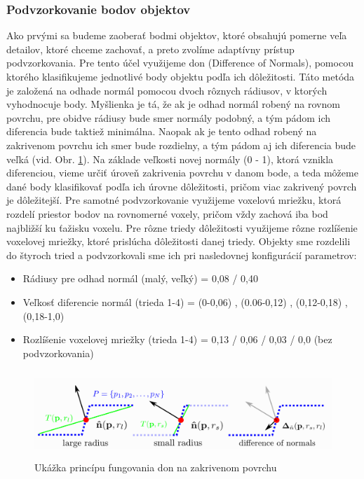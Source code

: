 \subsubsection{Podvzorkovanie bodov objektov}
\noindent Ako prvými sa budeme zaoberať bodmi objektov, ktoré obsahujú pomerne veľa detailov, ktoré chceme zachovať, a preto zvolíme adaptívny prístup podvzorkovania.
\newline\indent Pre tento účel využijeme \acrshort{don} (Difference of Normals), pomocou ktorého klasifikujeme jednotlivé body objektu podľa ich dôležitosti. Táto metóda je založená na odhade normál pomocou dvoch rôznych rádiusov, v ktorých vyhodnocuje body. Myšlienka je tá, že ak je odhad normál robený na rovnom povrchu, pre obidve rádiusy bude smer normály podobný, a tým pádom ich diferencia bude taktiež minimálna. Naopak ak je tento odhad robený na zakrivenom povrchu ich smer bude rozdielny, a tým pádom aj ich diferencia bude veľká (vid. Obr. \ref{fig:Don_principle}). Na základe veľkosti novej normály (0 - 1), ktorá vznikla diferenciou, vieme určiť úroveň zakrivenia povrchu v danom bode, a teda môžeme dané body klasifikovať podľa ich úrovne dôležitosti, pričom viac zakrivený povrch je dôležitejší.
\newline\indent Pre samotné podvzorkovanie využijeme voxelovú mriežku, ktorá rozdelí priestor bodov na rovnomerné voxely, pričom vždy zachová iba bod najbližší ku ťažisku voxelu. Pre rôzne triedy dôležitosti využijeme rôzne rozlíšenie voxelovej mriežky, ktoré prislúcha dôležitosti danej triedy. Objekty sme rozdelili do štyroch tried a podvzorkovali sme ich pri nasledovnej konfigurácií parametrov:

\begin{itemize}
  \setlength\itemsep{0.2em}
  \item Rádiusy pre odhad normál (malý, veľký) = 0,08 / 0,40
  \item Veľkosť diferencie normál (trieda 1-4) = (0-0,06) , (0.06-0,12) , (0,12-0,18) , (0,18-1,0)
  \item Rozlíšenie voxelovej mriežky (trieda 1-4) = 0,13 / 0,06 / 0,03 / 0,0 (bez podvzorkovania)
\end{itemize}

\begin{figure}[!htbp]
  \centering
  \includegraphics[width=15cm, height=3.3cm]{img/Don_principle.png}
  \caption{Ukážka princípu fungovania \acrshort{don} na zakrivenom povrchu \cite{DoN_segmentation}} 
  \label{fig:Don_principle}
\end{figure} 

